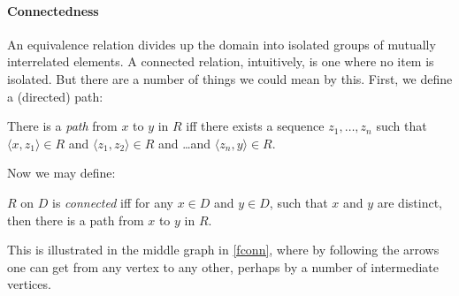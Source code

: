 \paragraph{Connectedness}
An equivalence relation divides up the domain into isolated groups of mutually interrelated elements. A connected relation, intuitively, is one where no item is isolated. But there are a number of things we could mean by this. First, we define a (directed) path: \begin{definition}[Path]
  There is a \emph{path} from $x$ to $y$ in $R$ iff there exists a sequence $z_{1},\ldots,z_{n}$ such that $\langle x,z_{1}\rangle \in R$ and
  $\langle z_{1},z_{2}\rangle \in R$ and \ldots and $\langle z_{n},y\rangle \in R$.
\end{definition}
Now we may define: \begin{definition}
  $R$ on $D$ is \emph{connected} iff for any $x \in D$ and $y \in D$, such that $x$ and $y$ are distinct, then there is a path from $x$ to $y$ in $R$. 
 \end{definition} This is illustrated in the middle graph in \autoref{fconn}, where by following the arrows one can get from any vertex to any other, perhaps by a number of intermediate vertices.

